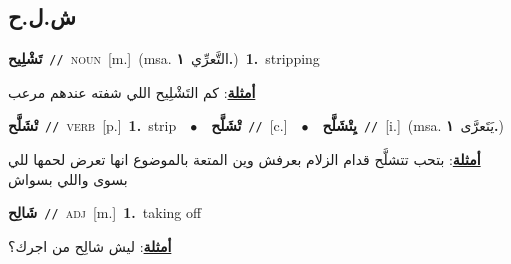 \documentclass[10pt,a4paper,twoside]{article} %
\begin{document}
\begin{multicols}{2}
\vspace{-3mm}
\subsection*{\color{blue}\foreignlanguage{arabic}{ش.ل.ح}\color{blue}{}} 

{\setlength\topsep{0pt}\textbf{\foreignlanguage{arabic}{تَشْلِيح}}\ {\color{gray}\texttt{//}\color{black}}\ \textsc{noun}\ [m.]\ \color{gray}(msa. \foreignlanguage{arabic}{التَّعرِّي}~\foreignlanguage{arabic}{\textbf{١.}})\color{black}\ \textbf{1.}~stripping\  \begin{flushright}\color{gray}\foreignlanguage{arabic}{\textbf{\underline{\foreignlanguage{arabic}{أمثلة}}}: كم التَشْلِيح اللي شفته عندهم مرعب}\end{flushright}\color{black}} \vspace{2mm}

{\setlength\topsep{0pt}\textbf{\foreignlanguage{arabic}{تْشَلَّح}}\ {\color{gray}\texttt{//}\color{black}}\ \textsc{verb}\ [p.]\ \textbf{1.}~strip\ \ $\bullet$\ \ \setlength\topsep{0pt}\textbf{\foreignlanguage{arabic}{تْشَلَّح}}\ {\color{gray}\texttt{//}\color{black}}\ [c.]\ \ $\bullet$\ \ \setlength\topsep{0pt}\textbf{\foreignlanguage{arabic}{يِتْشَلَّح}}\ {\color{gray}\texttt{//}\color{black}}\ [i.]\ \color{gray}(msa. \foreignlanguage{arabic}{يَتَعرَّى}~\foreignlanguage{arabic}{\textbf{١.}})\color{black}\  \begin{flushright}\color{gray}\foreignlanguage{arabic}{\textbf{\underline{\foreignlanguage{arabic}{أمثلة}}}: بتحب تتشلَّح قدام الزلام بعرفش وين المتعة بالموضوع انها تعرض لحمها للي بسوى واللي بسواش}\end{flushright}\color{black}} \vspace{2mm}

{\setlength\topsep{0pt}\textbf{\foreignlanguage{arabic}{شَالِح}}\ {\color{gray}\texttt{//}\color{black}}\ \textsc{adj}\ [m.]\ \textbf{1.}~taking off\  \begin{flushright}\color{gray}\foreignlanguage{arabic}{\textbf{\underline{\foreignlanguage{arabic}{أمثلة}}}: ليش شالِح من اجرك؟}\end{flushright}\color{black}} \vspace{2mm}


\end{multicols}
\end{document}
